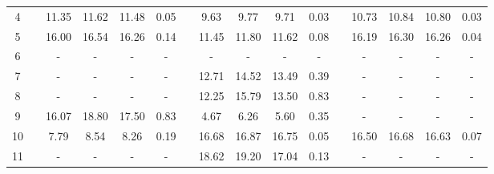 \begin{table*}
\begin{tabular}{cccccccccccccccc}
\cline{1-6} \cline{8-11} \cline{13-16} 
{\footnotesize 4} &  & {\footnotesize 11.35} & {\footnotesize 11.62} & {\footnotesize 11.48} & {\footnotesize 0.05} &  & {\footnotesize 9.63} & {\footnotesize 9.77} & {\footnotesize 9.71} & {\footnotesize 0.03} &  & {\footnotesize 10.73} & {\footnotesize 10.84} & {\footnotesize 10.80} & {\footnotesize 0.03}\tabularnewline
\cline{1-6} \cline{8-11} \cline{13-16} 
{\footnotesize 5} &  & {\footnotesize 16.00} & {\footnotesize 16.54} & {\footnotesize 16.26} & {\footnotesize 0.14} &  & {\footnotesize 11.45} & {\footnotesize 11.80} & {\footnotesize 11.62} & {\footnotesize 0.08} &  & {\footnotesize 16.19} & {\footnotesize 16.30} & {\footnotesize 16.26} & {\footnotesize 0.04}\tabularnewline
\cline{1-6} \cline{8-11} \cline{13-16} 
{\footnotesize 6} &  & {\footnotesize -} & {\footnotesize -} & {\footnotesize -} & {\footnotesize -} &  & {\footnotesize -} & {\footnotesize -} & {\footnotesize -} & {\footnotesize -} &  & {\footnotesize -} & {\footnotesize -} & {\footnotesize -} & {\footnotesize -}\tabularnewline
\cline{1-6} \cline{8-11} \cline{13-16} 
{\footnotesize 7} &  & {\footnotesize -} & {\footnotesize -} & {\footnotesize -} & {\footnotesize -} &  & {\footnotesize 12.71} & {\footnotesize 14.52} & {\footnotesize 13.49} & {\footnotesize 0.39} &  & {\footnotesize -} & {\footnotesize -} & {\footnotesize -} & {\footnotesize -}\tabularnewline
\cline{1-6} \cline{8-11} \cline{13-16} 
{\footnotesize 8} &  & {\footnotesize -} & {\footnotesize -} & {\footnotesize -} & {\footnotesize -} &  & {\footnotesize 12.25} & {\footnotesize 15.79} & {\footnotesize 13.50} & {\footnotesize 0.83} &  & {\footnotesize -} & {\footnotesize -} & {\footnotesize -} & {\footnotesize -}\tabularnewline
\cline{1-6} \cline{8-11} \cline{13-16} 
{\footnotesize 9} &  & {\footnotesize 16.07} & {\footnotesize 18.80} & {\footnotesize 17.50} & {\footnotesize 0.83} &  & {\footnotesize 4.67} & {\footnotesize 6.26} & {\footnotesize 5.60} & {\footnotesize 0.35} &  & {\footnotesize -} & {\footnotesize -} & {\footnotesize -} & {\footnotesize -}\tabularnewline
\cline{1-6} \cline{8-11} \cline{13-16} 
{\footnotesize 10} &  & {\footnotesize 7.79} & {\footnotesize 8.54} & {\footnotesize 8.26} & {\footnotesize 0.19} &  & {\footnotesize 16.68} & {\footnotesize 16.87} & {\footnotesize 16.75} & {\footnotesize 0.05} &  & {\footnotesize 16.50} & {\footnotesize 16.68} & {\footnotesize 16.63} & {\footnotesize 0.07}\tabularnewline
\cline{1-6} \cline{8-11} \cline{13-16} 
{\footnotesize 11} &  & {\footnotesize -} & {\footnotesize -} & {\footnotesize -} & {\footnotesize -} &  & {\footnotesize 18.62} & {\footnotesize 19.20} & {\footnotesize 17.04} & {\footnotesize 0.13} &  & {\footnotesize -} & {\footnotesize -} & {\footnotesize -} & {\footnotesize -}\tabularnewline
\hline 
\end{tabular}
\end{table*}



